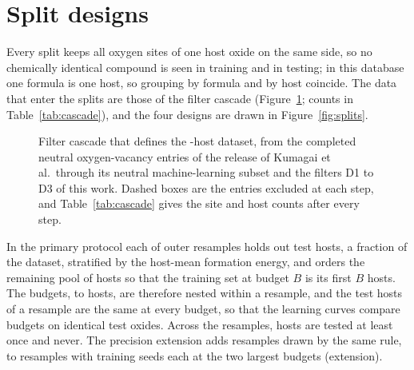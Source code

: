 \section{Split designs}
\label{si:splits}

Every split keeps all oxygen sites of one host oxide on the same side, so no chemically identical compound is
seen in training and in testing; in this database one formula is one host, so grouping by formula and by host
coincide. The data that enter the splits are those of the filter cascade (Figure~\ref{fig:cascade}; counts in
Table~\ref{tab:cascade}), and the four designs are drawn in Figure~\ref{fig:splits}.

\begin{figure}[htbp]
\centering
{}
\caption{Filter cascade that defines the \numFilterCascadeStepsFinalHosts{}-host dataset, from the completed neutral oxygen-vacancy entries of the release of
Kumagai et al.\ through its neutral machine-learning subset and the filters D1 to D3 of this work. Dashed boxes are
the entries excluded at each step, and Table~\ref{tab:cascade} gives the site and host counts after every step.}
\label{fig:cascade}
\end{figure}

In the primary protocol each of \numCfgSplitNOuterResamples{} outer resamples holds out
\numSplitMetaNTestHosts{} test hosts, a fraction \numSplitMetaTestFraction{} of the dataset, stratified by the
host-mean formation energy, and orders the remaining pool of \numSplitMetaPoolSize{} hosts so that the training
set at budget $B$ is its first $B$ hosts. The budgets, \numCfgBudgetsHostsItemOne{} to \numCfgBudgetsHostsItemSix{}
hosts, are therefore nested within a resample, and the test hosts of a resample are the same at every budget, so
that the learning curves compare budgets on identical test oxides. Across the resamples,
\numSplitMetaCoverageInTestAtLeastOnce{} hosts are tested at least once and \numSplitMetaCoverageNeverInTest{}
never. The precision extension adds resamples drawn by the same rule, to \numPrecisionABFourHundredBSixHundredFiftyFourSubsetsThirtyXFiveNResamples{}
resamples with \numPrecisionABFourHundredBSixHundredFiftyFourSubsetsThirtyXFiveNSeeds{} training seeds each at
the two largest budgets (extension).

